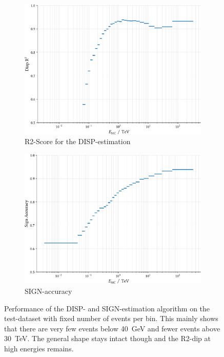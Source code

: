 \begin{figure}
    \begin{subfigure}{0.45\textwidth}
        \includegraphics[width=0.9\linewidth]{../analysis/plots/disp_test_r2_equal_filled.pdf} 
        \caption{R2-Score for the DISP-estimation}
    \end{subfigure}
    \begin{subfigure}{0.45\textwidth}
        \includegraphics[width=0.9\linewidth]{../analysis/plots/disp_test_acc_equal_filled.pdf}
        \caption{SIGN-accuracy}
    \end{subfigure}
    \caption{
	Performance of the DISP- and SIGN-estimation algorithm on the test-dataset
	with fixed number of events per bin. This mainly shows that there are very few
	events below \SI{40}{\giga\electronvolt} and fewer events above \SI{30}{\tera\electronvolt}.
	The general shape stays intact though and the R2-dip at high energies remains.}

    \label{fig:disp_test_perf_2}
\end{figure}

